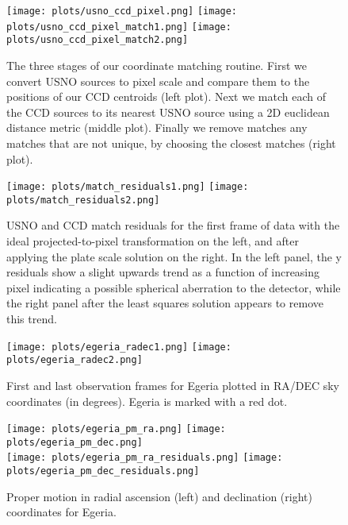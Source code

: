 \documentclass[preprint]{aastex62}
\begin{document}
\begin{figure}[H]
\begin{center}
\texttt{[image: plots/usno\_ccd\_pixel.png]}
\texttt{[image: plots/usno\_ccd\_pixel\_match1.png]}
\texttt{[image: plots/usno\_ccd\_pixel\_match2.png]}
\caption{The three stages of our coordinate matching routine. First we convert USNO sources to pixel scale and compare them to the positions of our CCD centroids (left plot). Next we match each of the CCD sources to its nearest USNO source using a 2D euclidean distance metric (middle plot). Finally we remove matches any matches that are not unique, by choosing the closest matches (right plot).} \label{fig:matching}
\end{center}
\end{figure}


\begin{figure}[H]
\begin{center}
\texttt{[image: plots/match\_residuals1.png]}
\texttt{[image: plots/match\_residuals2.png]}
\caption{USNO and CCD match residuals for the first frame of data with the ideal projected-to-pixel transformation on the left, and after applying the plate scale solution on the right. In the left panel, the y residuals show a slight upwards trend as a function of increasing pixel indicating a possible spherical aberration to the detector, while the right panel after the least squares solution appears to remove this trend.} \label{fig:residuals}
\end{center}
\end{figure}


\begin{figure}[H]
\begin{center}
\texttt{[image: plots/egeria\_radec1.png]}
\texttt{[image: plots/egeria\_radec2.png]}
\caption{First and last observation frames for Egeria plotted in RA/DEC sky coordinates (in degrees). Egeria is marked with a red dot.}
\end{center}
\end{figure}


\begin{figure}[H]
\begin{center}
\texttt{[image: plots/egeria\_pm\_ra.png]}
\texttt{[image: plots/egeria\_pm\_dec.png]}  \\
\texttt{[image: plots/egeria\_pm\_ra\_residuals.png]}
\texttt{[image: plots/egeria\_pm\_dec\_residuals.png]} 
\caption{Proper motion in radial ascension (left) and declination (right) coordinates for Egeria.}
\label{fig:proper_motion}
\end{center}
\end{figure}
\end{document}
